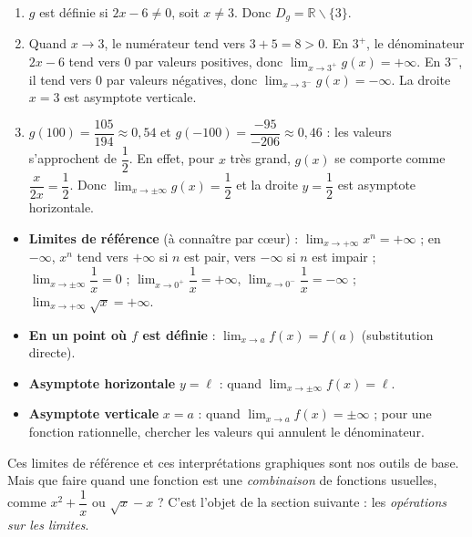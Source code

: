 \documentclass[11pt]{article}
\def\setminus{\mathbin{\backslash}}\let\smallsetminus\setminus
\begin{document}
\begin{corrige}[Exercice 1]
\begin{enumerate}
\item $g$ est définie si $2x - 6 \neq 0$, soit $x \neq 3$. Donc $D_g = \mathbb{R} \setminus \{3\}$.
\item Quand $x \to 3$, le numérateur tend vers $3 + 5 = 8 > 0$. En $3^+$, le dénominateur $2x - 6$ tend vers $0$ par valeurs positives, donc $\lim_{x \to 3^+} g(x) = +\infty$. En $3^-$, il tend vers $0$ par valeurs négatives, donc $\lim_{x \to 3^-} g(x) = -\infty$. La droite $x = 3$ est asymptote verticale.
\item $g(100) = \dfrac{105}{194} \approx 0{,}54$ et $g(-100) = \dfrac{-95}{-206} \approx 0{,}46$ : les valeurs s'approchent de $\dfrac{1}{2}$. En effet, pour $x$ très grand, $g(x)$ se comporte comme $\dfrac{x}{2x} = \dfrac{1}{2}$. Donc $\lim_{x \to \pm\infty} g(x) = \dfrac{1}{2}$ et la droite $y = \dfrac{1}{2}$ est asymptote horizontale.
\end{enumerate}
\end{corrige}

\begin{aretenir}
\begin{itemize}
\item \textbf{Limites de référence} (à connaître par cœur) : $\lim_{x \to +\infty} x^n = +\infty$ ; en $-\infty$, $x^n$ tend vers $+\infty$ si $n$ est pair, vers $-\infty$ si $n$ est impair ; $\lim_{x \to \pm\infty} \dfrac{1}{x} = 0$ ; $\lim_{x \to 0^+} \dfrac{1}{x} = +\infty$, $\lim_{x \to 0^-} \dfrac{1}{x} = -\infty$ ; $\lim_{x \to +\infty} \sqrt{x} = +\infty$.
\item \textbf{En un point où $f$ est définie} : $\lim_{x \to a} f(x) = f(a)$ (substitution directe).
\item \textbf{Asymptote horizontale} $y = \ell$ : quand $\lim_{x \to \pm\infty} f(x) = \ell$.
\item \textbf{Asymptote verticale} $x = a$ : quand $\lim_{x \to a} f(x) = \pm\infty$ ; pour une fonction rationnelle, chercher les valeurs qui annulent le dénominateur.
\end{itemize}
\end{aretenir}

Ces limites de référence et ces interprétations graphiques sont nos outils de base. Mais que faire quand une fonction est une \emph{combinaison} de fonctions usuelles, comme $x^2 + \dfrac{1}{x}$ ou $\sqrt{x} - x$ ? C'est l'objet de la section suivante : les \emph{opérations sur les limites}.
\end{document}

